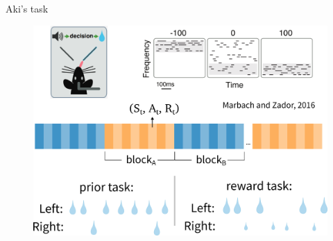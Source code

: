 \documentclass[14pt]{beamer}
\begin{document}
\begin{frame}{Aki's task}
  \begin{figure}[htb]
    \includegraphics[width=\textwidth]{images/akitask}
  \end{figure}
\end{frame}
\end{document}
